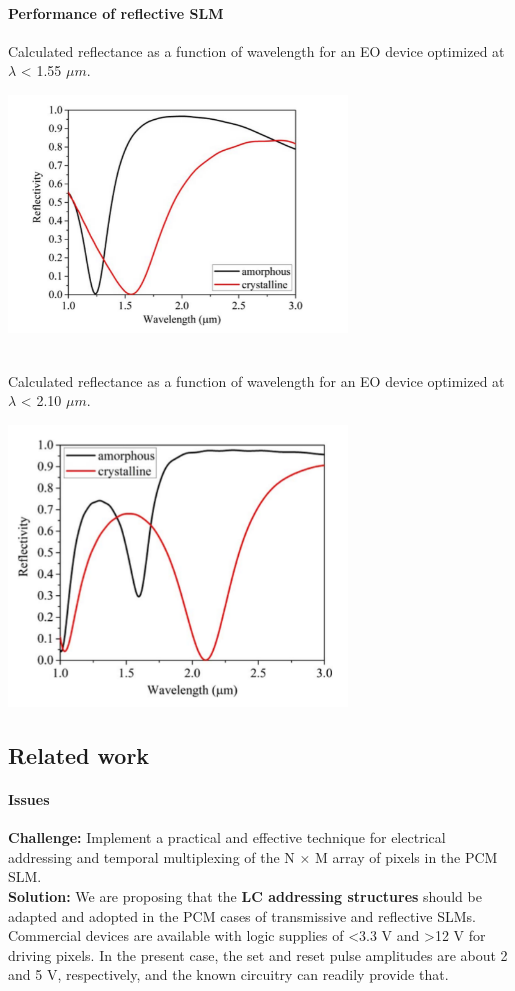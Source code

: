 \documentclass[]{article}
\let\oldparagraph\paragraph
\renewcommand{\paragraph}[1]{\oldparagraph{#1}\mbox{}}
\begin{document}
\paragraph{Performance of reflective
SLM}\label{performance-of-reflective-slm}

Calculated reflectance as a function of wavelength for an EO device
optimized at $\lambda$ < 1.55 $\mu m$.\\
\centerline{\includegraphics[width = 9cm]{image/002_10.png}}\\
Calculated reflectance as a function of wavelength for an EO device
optimized at $\lambda$ < 2.10 $\mu m$.\\
\centerline{\includegraphics[width = 9cm]{image/002_11.png}}

\subsection{Related work}\label{related-work}

\paragraph{Issues}\label{issues}

\textbf{Challenge:} Implement a practical and effective technique for
electrical addressing and temporal multiplexing of the N × M array of
pixels in the PCM SLM.\\
\textbf{Solution:} We are proposing that the \textbf{LC addressing
structures} should be adapted and adopted in the PCM cases of
transmissive and reflective SLMs. Commercial devices are available with
logic supplies of \textless{}3.3 V and \textgreater{}12 V for driving
pixels. In the present case, the set and reset pulse amplitudes are
about 2 and 5 V, respectively, and the known circuitry can readily
provide that.
\end{document}
